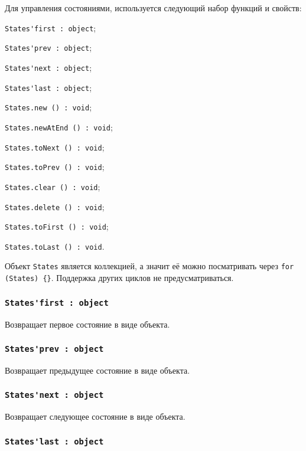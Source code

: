 Для управления состояниями, используется следующий набор функций и свойств:
\begin{icItems}
	\item \lstinline|States'first : object|;
	\item \lstinline|States'prev : object|;
	\item \lstinline|States'next : object|;
	\item \lstinline|States'last : object|;
	\item \lstinline|States.new () : void|;
	\item \lstinline|States.newAtEnd () : void|;
	\item \lstinline|States.toNext () : void|;
	\item \lstinline|States.toPrev () : void|;
	\item \lstinline|States.clear () : void|;
	\item \lstinline|States.delete () : void|;
	\item \lstinline|States.toFirst () : void|;
	\item \lstinline|States.toLast () : void|.
\end{icItems}

Объект \lstinline|States| является коллекцией, а значит её можно посматривать через \lstinline|for (States) {}|. Поддержка других циклов не предусматриваться.

\subsubsection{\lstinline|States'first : object|}

Возвращает первое состояние в виде объекта.

\subsubsection{\lstinline|States'prev : object|}

Возвращает предыдущее состояние в виде объекта.

\subsubsection{\lstinline|States'next : object|}

Возвращает следующее состояние в виде объекта.

\subsubsection{\lstinline|States'last : object|}

